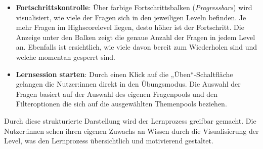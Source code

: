 \begin{itemize}
    \item \textbf{Fortschrittskontrolle}:
    Über farbige Fortschrittsbalken (\textit{Progressbars}) wird visualisiert, wie viele der Fragen sich in den jeweiligen Leveln befinden. Je mehr Fragen im Highscorelevel liegen, desto höher ist der Fortschritt. Die Anzeige unter den Balken zeigt die genaue Anzahl der Fragen in jedem Level an. Ebenfalls ist ersichtlich, wie viele davon bereit zum Wiederholen sind und welche momentan gesperrt sind.
    \item \textbf{Lernsession starten}:
    Durch einen Klick auf die „Üben“-Schaltfläche gelangen die Nutzer:innen direkt in den Übungsmodus. Die Auswahl der Fragen basiert auf der Auswahl des eigenen Fragenpools und den Filteroptionen die sich auf die ausgewählten Themenpools beziehen. 
\end{itemize}

Durch diese strukturierte Darstellung wird der Lernprozess greifbar gemacht. Die Nutzer:innen sehen ihren eigenen Zuwachs an Wissen durch die Visualisierung der Level, was den Lernprozess übersichtlich und motivierend gestaltet.